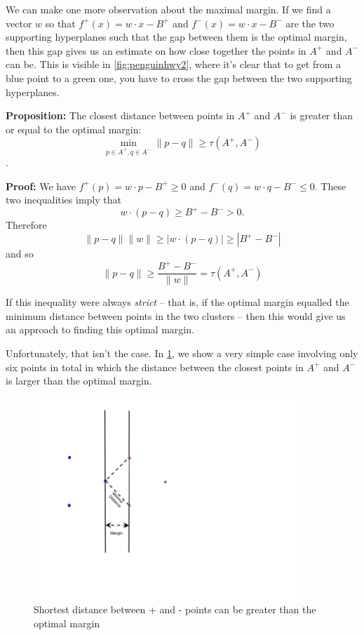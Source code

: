 \documentclass[
  oneside]{scrbook}
\begin{document}
We can make one more observation about the maximal margin. If we find a
vector \(w\) so that \(f^{+}(x) = w\cdot x -B^{+}\) and
\(f^{-}(x) = w\cdot x-B^{-}\) are the two supporting hyperplanes such
that the gap between them is the optimal margin, then this gap gives us
an estimate on how close together the points in \(A^{+}\) and \(A^{-}\)
can be. This is visible in \cref{fig:penguinhwy2}, where it's clear that
to get from a blue point to a green one, you have to cross the gap
between the two supporting hyperplanes.

\textbf{Proposition:} The closest distance between points in \(A^{+}\)
and \(A^{-}\) is greater than or equal to the optimal margin: \[
\min_{p\in A^{+},q\in A^{-}} \|p-q\|\ge \tau(A^{+},A^{-})
\].

\textbf{Proof:} We have \(f^{+}(p) = w\cdot p - B^{+}\ge 0\) and
\(f^{-}(q) = w\cdot q -B^{-}\le 0\). These two inequalities imply that
\[
w\cdot (p-q)\ge B^{+}-B^{-}>0.
\] Therefore \[
\|p-q\|\|w\|\ge |w\cdot (p-q)|\ge |B^{+}-B^{-}|
\] and so \[
\|p-q\| \ge \frac{B^{+}-B^{-}}{\|w\|} = \tau(A^{+},A^{-})
\]

If this inequality were always \emph{strict} -- that is, if the optimal
margin equalled the minimum distance between points in the two clusters
-- then this would give us an approach to finding this optimal margin.

Unfortunately, that isn't the case. In \cref{fig:nonstrict}, we show a
very simple case involving only six points in total in which the
distance between the closest points in \(A^{+}\) and \(A^{-}\) is larger
than the optimal margin.

\begin{figure}
\hypertarget{fig:nonstrict}{%
\centering
\includegraphics[width=\textwidth,height=3in]{img/margindistance2.png}
\caption{Shortest distance between + and - points can be greater than
the optimal margin}\label{fig:nonstrict}
}
\end{figure}
\end{document}
